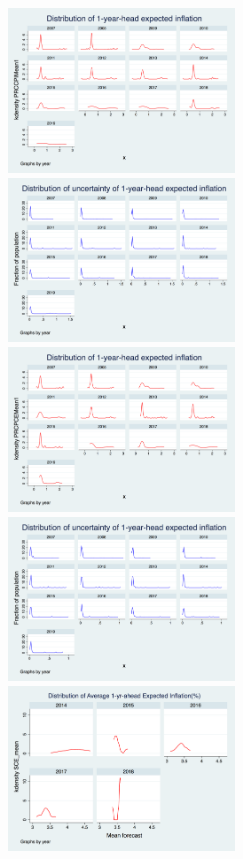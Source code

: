 \documentclass[]{article}
\begin{document}
\begin{figure}[h]\label{Unceratitny_Histogram}
	\centering
	\includegraphics[width=6cm]{figures/PRCCPIMean1_hist.png} 
	\includegraphics[width=6cm]{figures/PRCCPIVar1_hist.png}  \\
	\smallskip
		\includegraphics[width=6cm]{figures/PRCPCEMean1_hist.png} 
	\includegraphics[width=6cm]{figures/PRCPCEVar1_hist.png}  \\
	\smallskip
		\includegraphics[width=6cm]{figures/SCEmean_hist.png} 

\end{figure}
\end{document}
